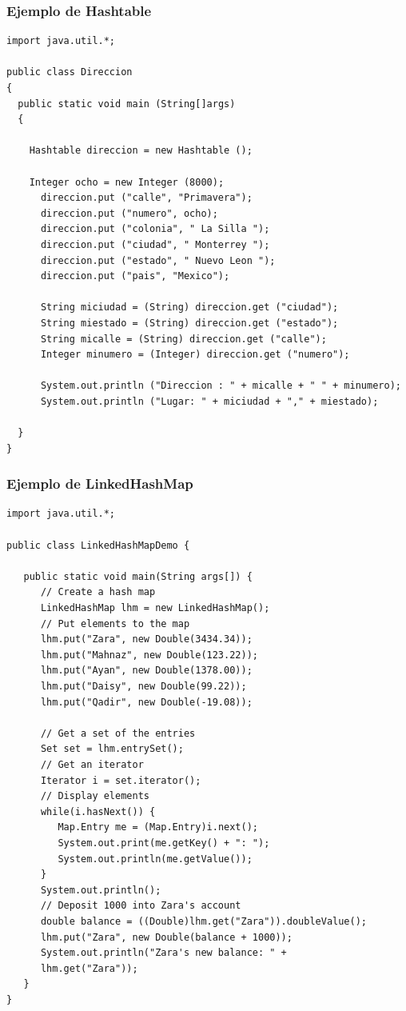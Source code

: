 \documentclass{beamer}
\begin{document}
\begin{frame}[fragile]
\frametitle{Ejemplo de Hashtable}
\begin{tiny}
\begin{verbatim}
import java.util.*;

public class Direccion
{
  public static void main (String[]args)
  {

    Hashtable direccion = new Hashtable ();

    Integer ocho = new Integer (8000);
      direccion.put ("calle", "Primavera");
      direccion.put ("numero", ocho);
      direccion.put ("colonia", " La Silla ");
      direccion.put ("ciudad", " Monterrey ");
      direccion.put ("estado", " Nuevo Leon ");
      direccion.put ("pais", "Mexico");

      String miciudad = (String) direccion.get ("ciudad");
      String miestado = (String) direccion.get ("estado");
      String micalle = (String) direccion.get ("calle");
      Integer minumero = (Integer) direccion.get ("numero");

      System.out.println ("Direccion : " + micalle + " " + minumero);
      System.out.println ("Lugar: " + miciudad + "," + miestado);

  }
}
\end{verbatim}
\end{tiny}
\end{frame}

\begin{frame}[fragile]
\frametitle{Ejemplo de LinkedHashMap}
\begin{tiny}
\begin{verbatim}
import java.util.*;

public class LinkedHashMapDemo {

   public static void main(String args[]) {
      // Create a hash map
      LinkedHashMap lhm = new LinkedHashMap();
      // Put elements to the map
      lhm.put("Zara", new Double(3434.34));
      lhm.put("Mahnaz", new Double(123.22));
      lhm.put("Ayan", new Double(1378.00));
      lhm.put("Daisy", new Double(99.22));
      lhm.put("Qadir", new Double(-19.08));
      
      // Get a set of the entries
      Set set = lhm.entrySet();
      // Get an iterator
      Iterator i = set.iterator();
      // Display elements
      while(i.hasNext()) {
         Map.Entry me = (Map.Entry)i.next();
         System.out.print(me.getKey() + ": ");
         System.out.println(me.getValue());
      }
      System.out.println();
      // Deposit 1000 into Zara's account
      double balance = ((Double)lhm.get("Zara")).doubleValue();
      lhm.put("Zara", new Double(balance + 1000));
      System.out.println("Zara's new balance: " +
      lhm.get("Zara"));
   }
}
\end{verbatim}
\end{tiny}
\end{frame}
\end{document}
